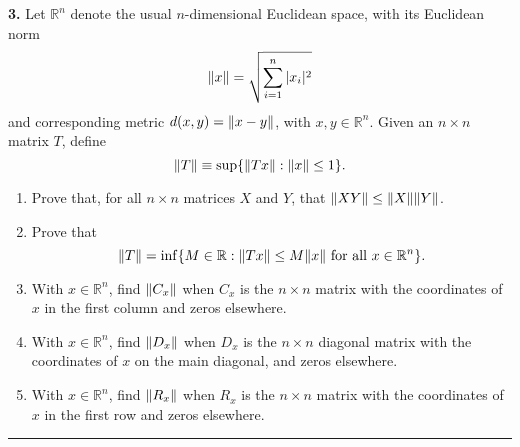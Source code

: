 \documentclass[11pt]{article}
\begin{document}
\newpage


\noindent \textbf{3.} Let $\mathbb{R}^n$ denote the usual $n$-dimensional Euclidean space,   with its Euclidean  norm
$$ \norm{x} = \sqrt{ \sum_{i=1}^n |x_i|^2}$$ and corresponding metric $d(x,y) = \norm{x-y}$,  with    $ x,y \in \mathbb{R}^n$.
Given an $n \times n$ matrix $T$,  define 
$$ \norm{T} \equiv \sup  \{ \norm{Tx} : \norm{x} \leq 1\} .$$

\begin{enumerate}
	\item  Prove that,   for all $n \times n$ matrices $X$ and $Y$,  that $\norm{XY} \leq \norm{X}  \norm{Y}$.
	\item  Prove that
	$$ \norm{T}=  \inf  \{ M \in \mathbb{R} : \norm{T x } \leq M \norm{ x }   \mbox{ for all } x \in \mathbb{R}^n \}. $$
	\item  With $x \in \mathbb{R}^n$,   find $ \norm{C_x} $ when $C_x$ is the $n \times n$ matrix with the coordinates of $x$ in the first column and zeros elsewhere.
	\item   With $x \in \mathbb{R}^n$,   find $ \norm{D_x} $ when $D_x$ is the $n \times n$ diagonal matrix with the coordinates of  $x$  on the main diagonal,
	and zeros elsewhere.
	\item  With $x \in \mathbb{R}^n$,   find $ \norm{R_x} $ when $R_x$ is the $n \times n$ matrix with the coordinates of $x$ in the first row and zeros elsewhere.
	
\end{enumerate}

\hrule
\end{document}
